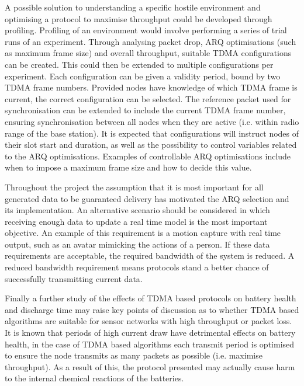 \documentclass[parskip]{cs4rep}
\begin{document}
A possible solution to understanding a specific hostile environment and optimising a protocol to maximise throughput could be developed through profiling. Profiling of an environment would involve performing a series of trial runs of an experiment. Through analysing packet drop, ARQ optimisations (such as maximum frame size) and overall throughput, suitable TDMA configurations can be created. This could then be extended to multiple configurations per experiment. Each configuration can be given a validity period, bound by two TDMA frame numbers. Provided nodes have knowledge of which TDMA frame is current, the correct configuration can be selected. The reference packet used for synchronisation can be extended to include the current TDMA frame number, ensuring synchronisation between all nodes when they are active (i.e. within radio range of the base station). It is expected that configurations will instruct nodes of their slot start and duration, as well as the possibility to control variables related to the ARQ optimisations. Examples of controllable ARQ optimisations include when to impose a maximum frame size and how to decide this value. 

Throughout the project the assumption that it is most important for all generated data to be guaranteed delivery has motivated the ARQ selection and its implementation. An alternative scenario should be considered in which receiving enough data to update a real time model is the most important objective. An example of this requirement is a motion capture with real time output, such as an avatar mimicking the actions of a person. If these data requirements are acceptable, the required bandwidth of the system is reduced. A reduced bandwidth requirement means protocols stand a better chance of successfully transmitting current data. 

Finally a further study of the effects of TDMA based protocols on battery health and discharge time may raise key points of discussion as to whether TDMA based algorithms are suitable for sensor networks with high throughput or packet loss. It is known that periods of high current draw have detrimental effects on battery health, in the case of TDMA based algorithms each transmit period is optimised to ensure the node transmits as many packets as possible (i.e. maximise throughput). As a result of this, the protocol presented may actually cause harm to the internal chemical reactions of the batteries. 




\end{document}

